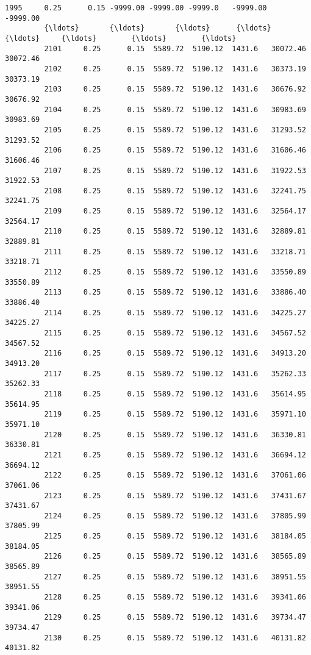 \documentclass[11pt]{article}
\begin{document}
\begin{Verbatim}[commandchars=\\\{\}]
         1995     0.25      0.15 -9999.00 -9999.00 -9999.0   -9999.00   -9999.00   
         {\ldots}       {\ldots}       {\ldots}      {\ldots}      {\ldots}     {\ldots}        {\ldots}        {\ldots}   
         2101     0.25      0.15  5589.72  5190.12  1431.6   30072.46   30072.46   
         2102     0.25      0.15  5589.72  5190.12  1431.6   30373.19   30373.19   
         2103     0.25      0.15  5589.72  5190.12  1431.6   30676.92   30676.92   
         2104     0.25      0.15  5589.72  5190.12  1431.6   30983.69   30983.69   
         2105     0.25      0.15  5589.72  5190.12  1431.6   31293.52   31293.52   
         2106     0.25      0.15  5589.72  5190.12  1431.6   31606.46   31606.46   
         2107     0.25      0.15  5589.72  5190.12  1431.6   31922.53   31922.53   
         2108     0.25      0.15  5589.72  5190.12  1431.6   32241.75   32241.75   
         2109     0.25      0.15  5589.72  5190.12  1431.6   32564.17   32564.17   
         2110     0.25      0.15  5589.72  5190.12  1431.6   32889.81   32889.81   
         2111     0.25      0.15  5589.72  5190.12  1431.6   33218.71   33218.71   
         2112     0.25      0.15  5589.72  5190.12  1431.6   33550.89   33550.89   
         2113     0.25      0.15  5589.72  5190.12  1431.6   33886.40   33886.40   
         2114     0.25      0.15  5589.72  5190.12  1431.6   34225.27   34225.27   
         2115     0.25      0.15  5589.72  5190.12  1431.6   34567.52   34567.52   
         2116     0.25      0.15  5589.72  5190.12  1431.6   34913.20   34913.20   
         2117     0.25      0.15  5589.72  5190.12  1431.6   35262.33   35262.33   
         2118     0.25      0.15  5589.72  5190.12  1431.6   35614.95   35614.95   
         2119     0.25      0.15  5589.72  5190.12  1431.6   35971.10   35971.10   
         2120     0.25      0.15  5589.72  5190.12  1431.6   36330.81   36330.81   
         2121     0.25      0.15  5589.72  5190.12  1431.6   36694.12   36694.12   
         2122     0.25      0.15  5589.72  5190.12  1431.6   37061.06   37061.06   
         2123     0.25      0.15  5589.72  5190.12  1431.6   37431.67   37431.67   
         2124     0.25      0.15  5589.72  5190.12  1431.6   37805.99   37805.99   
         2125     0.25      0.15  5589.72  5190.12  1431.6   38184.05   38184.05   
         2126     0.25      0.15  5589.72  5190.12  1431.6   38565.89   38565.89   
         2127     0.25      0.15  5589.72  5190.12  1431.6   38951.55   38951.55   
         2128     0.25      0.15  5589.72  5190.12  1431.6   39341.06   39341.06   
         2129     0.25      0.15  5589.72  5190.12  1431.6   39734.47   39734.47   
         2130     0.25      0.15  5589.72  5190.12  1431.6   40131.82   40131.82   
         

\end{Verbatim}
\end{document}
